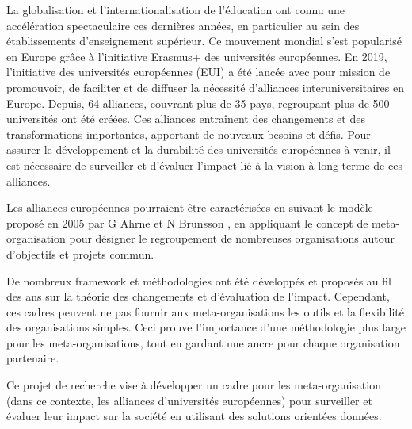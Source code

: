 La globalisation et l'internationalisation de l'éducation ont connu une accélération spectaculaire ces dernières années, en particulier au sein des établissements d'enseignement supérieur. Ce mouvement mondial s'est popularisé en Europe grâce à l'initiative Erasmus+ des universités européennes. En 2019, l'initiative des universités européennes (EUI) a été lancée avec pour mission de promouvoir, de faciliter et de diffuser la nécessité d'alliances interuniversitaires en Europe. Depuis, 64 alliances, couvrant plus de 35 pays, regroupant plus de 500 universités ont été créées. Ces alliances entraînent des changements et des transformations importantes, apportant de nouveaux besoins et défis. Pour assurer le développement et la durabilité des universités européennes à venir, il est nécessaire de surveiller et d'évaluer l'impact lié à la vision à long terme de ces alliances.

Les alliances européennes pourraient être caractérisées en suivant le modèle proposé en 2005 par G Ahrne et N Brunsson \cite{ahrne_organizations_2005}, en appliquant le concept de meta-organisation pour désigner le regroupement de nombreuses organisations autour d'objectifs et projets commun. 

De nombreux framework et méthodologies ont été développés et proposés au fil des ans sur la théorie des changements et  d'évaluation de l'impact. Cependant, ces cadres peuvent ne pas fournir aux meta-organisations les outils et la flexibilité des organisations simples. Ceci prouve l'importance d'une méthodologie plus large pour les meta-organisations, tout en gardant une ancre pour chaque organisation partenaire.

Ce projet de recherche vise à développer un cadre pour les meta-organisation (dans ce contexte, les alliances d'universités européennes) pour surveiller et évaluer leur impact sur la société en utilisant des solutions orientées données.